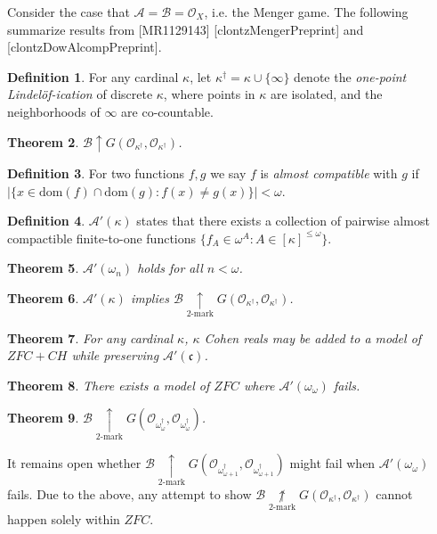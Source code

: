 \documentclass[11pt]{article}
\theoremstyle{plain}
\newtheorem{theorem}{Theorem}
\theoremstyle{definition}
\newtheorem{definition}[theorem]{Definition}
\theoremstyle{remark}
\theoremstyle{plain}
\theoremstyle{definition}
\theoremstyle{remark}
\newcommand{\win}{\uparrow}
\newcommand{\kmarkwin}[1]{\underset{#1\text{-mark}}{\uparrow}}
\newcommand{\notkmarkwin}[1]{\underset{#1\text{-mark}}{\not\uparrow}}
\newcommand{\onePtLind}[1]{#1^\dagger}
\newcommand{\sGame}[2]{G(#1,#2)}
\newcommand{\<}{\langle}
\renewcommand{\>}{\rangle}
\newcommand{\mc}[1]{\mathcal{#1}}
\newcommand{\mf}[1]{\mathfrak{#1}}
\newcommand{\dom}{\textrm{dom}}
\newcommand{\alcompSP}[1]{\mc A'(#1)}
\newcommand{\pl}[1]{\mathscr{#1}}
\newcommand{\term}{\textit}
\begin{document}
Consider the case that \(\mc A=\mc B=\mc O_X\),
i.e. the Menger game. The following summarize results from
[MR1129143]
[clontzMengerPreprint] and [clontzDowAlcompPreprint].

\begin{definition}
  For any cardinal \(\kappa\), let \(\onePtLind\kappa=\kappa\cup\{\infty\}\)
  denote the \term{one-point Lindel\"of-ication} of discrete \(\kappa\),
  where points in \(\kappa\) are isolated, and the neighborhoods of
  \(\infty\) are co-countable.
\end{definition}

\begin{theorem}
  \(\pl B\win\sGame{\mc O_{\onePtLind\kappa}}{\mc O_{\onePtLind\kappa}}\).
\end{theorem}

\begin{definition}
  For two functions \(f,g\) we say \(f\) is \term{almost compatible} with
  \(g\) if \(|\{x\in\dom(f)\cap\dom(g):f(x)\not=g(x)\}|<\omega\).
\end{definition}

\begin{definition}
  \(\alcompSP\kappa\) states that there exists a collection of pairwise
  almost compactible finite-to-one functions
  \(\{f_A\in\omega^A:A\in[\kappa]^{\leq\omega}\}\).
\end{definition}

\begin{theorem}
  \(\alcompSP{\omega_n}\) holds for all \(n<\omega\).
\end{theorem}

\begin{theorem}
  \(\alcompSP\kappa\) implies
  \(\pl B\kmarkwin{2}\sGame{\mc O_{\onePtLind\kappa}}{\mc O_{\onePtLind\kappa}}\).
\end{theorem}

\begin{theorem}
  For any cardinal \(\kappa\),
  \(\kappa\) Cohen reals may be added to a model of \(ZFC+CH\)
  while preserving \(\alcompSP{\mf c}\).
\end{theorem}

\begin{theorem}
  There exists a model of \(ZFC\) where \(\alcompSP{\omega_\omega}\) fails.
\end{theorem}

\begin{theorem}
  \(
    \pl B
      \kmarkwin{2}
    \sGame{
      \mc O_{\onePtLind{\omega_\omega}}
    }{
      \mc O_{\onePtLind{\omega_\omega}}
    }
  \).
\end{theorem}

It remains open whether
  \(
    \pl B
      \kmarkwin{2}
    \sGame{
      \mc O_{\onePtLind{\omega_{\omega+1}}}
    }{
      \mc O_{\onePtLind{\omega_{\omega+1}}}
    }
  \)
might fail when \(\alcompSP{\omega_\omega}\) fails. Due to the above,
any attempt to show
  \(
    \pl B
      \notkmarkwin{2}
    \sGame{
      \mc O_{\onePtLind{\kappa}}
    }{
      \mc O_{\onePtLind{\kappa}}
    }
  \)
cannot happen solely within \(ZFC\).
\end{document}
